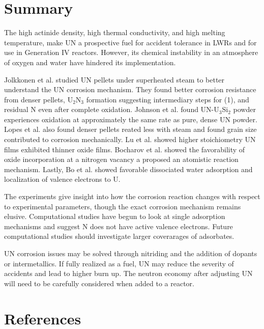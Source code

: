 \documentclass[3p,review,11pt]{elsarticle}
\begin{document}
\section{Summary}
The high actinide density, high thermal conductivity, and high melting temperature, make UN a prospective fuel for accident tolerance in LWRs and for use in Generation IV reactors. However, its chemical instability in an atmosphere of oxygen and water have hindered its implementation. 
\par Jolkkonen et al. \cite{Jolkkonen2017} studied UN pellets under superheated steam to better understand the UN corrosion mechanism. They found better corrosion resistance from denser pellets, U$_{2}$N$_{3}$ formation suggesting intermediary steps for (1), and residual N even after complete oxidation. Johnson et al. \cite{Johnson2016} found UN-U$_{3}$Si$_{2}$ powder experiences oxidation at approximately the same rate as pure, dense UN powder. Lopes et al. \cite{Lopes2017} also found denser pellets reated less with steam and found grain size contributed to corrosion mechanically. Lu et al. showed higher stoichiometry UN films exhibited thinner oxide films. Bocharov et al. \cite{Bocharov2013} showed the favorability of oxide incorporation at a nitrogen vacancy a proposed an atomistic reaction mechanism. Lastly, Bo et al. \cite{Bo2016} showed favorable dissociated water adsorption and localization of valence electrons to U.
\par The experiments give insight into how the corrosion reaction changes with respect to experimental parameters, though the exact corrosion mechanism remains elusive. Computational studies have begun to look at single adsorption mechanisms and suggest N does not have active valence electrons. Future computational studies should investigate larger coverarages of adsorbates. 
\par UN corrosion issues may be solved through nitriding and the addition of dopants or intermetallics. If fully realized as a fuel, UN may reduce the severity of accidents and lead to higher burn up. The neutron economy after adjusting UN will need to be carefully considered when added to a reactor.











\section*{References}




\end{document}
